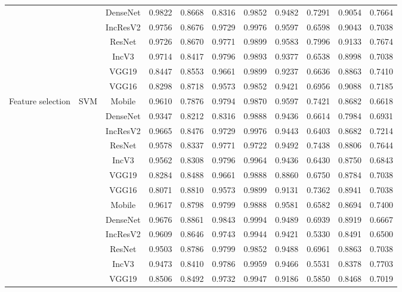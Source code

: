 \begin{table}
\begin{tabular}{|c|c|c|ccccc|ccc|}
    & & DenseNet & 0.9822 & 0.8668 & 0.8316 & 0.9852 & 0.9482 & 0.7291 & 0.9054 & 0.7664 \\
    & & IncResV2 & 0.9756 & 0.8676 & 0.9729 & 0.9976 & 0.9597 & 0.6598 & 0.9043 & 0.7038 \\
    & & ResNet & 0.9726 & 0.8670 & 0.9771 & 0.9899 & 0.9583 & 0.7996 & 0.9133 & 0.7674 \\
    & & IncV3 & 0.9714 & 0.8417 & 0.9796 & 0.9893 & 0.9377 & 0.6538 & 0.8998 & 0.7038 \\
    & & VGG19 & 0.8447 & 0.8553 & 0.9661 & 0.9899 & 0.9237 & 0.6636 & 0.8863 & 0.7410 \\
    & & VGG16 & 0.8298 & 0.8718 & 0.9573 & 0.9852 & 0.9421 & 0.6956 & 0.9088 & 0.7185 \\
    \hline
    \multirow{8}{*}{Feature selection} & \multirow{8}{*}{SVM} & Mobile & 0.9610 & 0.7876 & 0.9794 & 0.9870 & 0.9597 & 0.7421 & 0.8682 & 0.6618 \\
    & & DenseNet & 0.9347 & 0.8212 & 0.8316 & 0.9888 & 0.9436 & 0.6614 & 0.7984 & 0.6931 \\
    & & IncResV2 & 0.9665 & 0.8476 & 0.9729 & 0.9976 & 0.9443 & 0.6403 & 0.8682 & 0.7214 \\
    & & ResNet & 0.9578 & 0.8337 & 0.9771 & 0.9722 & 0.9492 & 0.7438 & 0.8806 & 0.7644 \\
    & & IncV3 & 0.9562 & 0.8308 & 0.9796 & 0.9964 & 0.9436 & 0.6430 & 0.8750 & 0.6843 \\
    & & VGG19 & 0.8284 & 0.8488 & 0.9661 & 0.9888 & 0.8860 & 0.6750 & 0.8784 & 0.7038 \\
    & & VGG16 & 0.8071 & 0.8810 & 0.9573 & 0.9899 & 0.9131 & 0.7362 & 0.8941 & 0.7038 \\
    \hline
    \multirow{8}{*}{Feature selection} & \multirow{8}{*}{ET} & Mobile & 0.9617 & 0.8798 & 0.9799 & 0.9888 & 0.9581 & 0.6582 & 0.8694 & 0.7400 \\
    & & DenseNet & 0.9676 & 0.8861 & 0.9843 & 0.9994 & 0.9489 & 0.6939 & 0.8919 & 0.6667 \\
    & & IncResV2 & 0.9609 & 0.8646 & 0.9743 & 0.9944 & 0.9421 & 0.5330 & 0.8491 & 0.6500 \\
    & & ResNet & 0.9503 & 0.8786 & 0.9799 & 0.9852 & 0.9488 & 0.6961 & 0.8863 & 0.7038 \\
    & & IncV3 & 0.9473 & 0.8410 & 0.9786 & 0.9959 & 0.9466 & 0.5531 & 0.8378 & 0.7703 \\
    & & VGG19 & 0.8506 & 0.8492 & 0.9732 & 0.9947 & 0.9186 & 0.5850 & 0.8468 & 0.7019 \\

\end{tabular}
\end{table}
